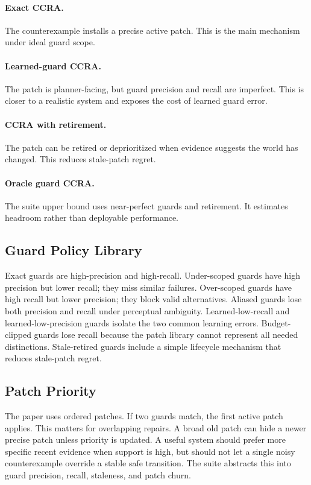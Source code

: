 \documentclass{article}
\newcommand{\ccra}{\textsc{CCRA}}
\begin{document}
\paragraph{Exact \ccra{}.}
The counterexample installs a precise active patch. This is the main mechanism
under ideal guard scope.

\paragraph{Learned-guard \ccra{}.}
The patch is planner-facing, but guard precision and recall are imperfect. This
is closer to a realistic system and exposes the cost of learned guard error.

\paragraph{\ccra{} with retirement.}
The patch can be retired or deprioritized when evidence suggests the world has
changed. This reduces stale-patch regret.

\paragraph{Oracle guard \ccra{}.}
The suite upper bound uses near-perfect guards and retirement. It estimates
headroom rather than deployable performance.

\subsection{Guard Policy Library}

Exact guards are high-precision and high-recall. Under-scoped guards have high
precision but lower recall; they miss similar failures. Over-scoped guards have
high recall but lower precision; they block valid alternatives. Aliased guards
lose both precision and recall under perceptual ambiguity. Learned-low-recall
and learned-low-precision guards isolate the two common learning errors.
Budget-clipped guards lose recall because the patch library cannot represent all
needed distinctions. Stale-retired guards include a simple lifecycle mechanism
that reduces stale-patch regret.

\subsection{Patch Priority}

The paper uses ordered patches. If two guards match, the first active patch
applies. This matters for overlapping repairs. A broad old patch can hide a
newer precise patch unless priority is updated. A useful system should prefer
more specific recent evidence when support is high, but should not let a single
noisy counterexample override a stable safe transition. The suite abstracts this
into guard precision, recall, staleness, and patch churn.
\end{document}
